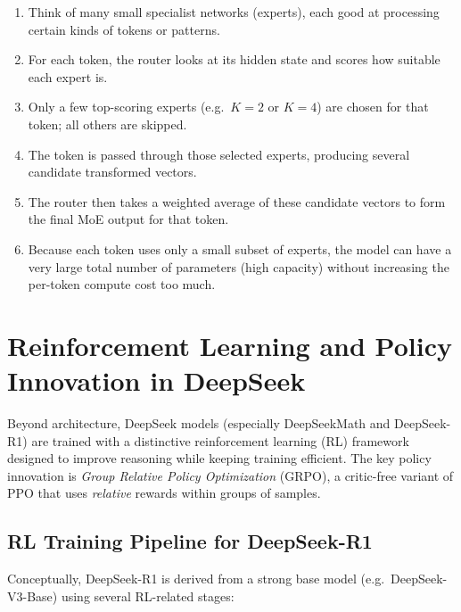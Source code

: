 \documentclass[11pt]{article}
\theoremstyle{remark}
\begin{document}
\begin{enumerate}[label=\arabic*)]
  \item Think of many small specialist networks (experts), each good at processing certain kinds of tokens or patterns.
  \item For each token, the router looks at its hidden state and scores how suitable each expert is.
  \item Only a few top-scoring experts (e.g.\ $K=2$ or $K=4$) are chosen for that token; all others are skipped.
  \item The token is passed through those selected experts, producing several candidate transformed vectors.
  \item The router then takes a weighted average of these candidate vectors to form the final MoE output for that token.
  \item Because each token uses only a small subset of experts, the model can have a very large total number of parameters (high capacity) without increasing the per-token compute cost too much.
\end{enumerate}

\section{Reinforcement Learning and Policy Innovation in DeepSeek}

Beyond architecture, DeepSeek models (especially DeepSeekMath and DeepSeek-R1) are trained with a distinctive reinforcement learning (RL) framework designed to improve reasoning while keeping training efficient. The key policy innovation is \emph{Group Relative Policy Optimization} (GRPO), a critic-free variant of PPO that uses \emph{relative} rewards within groups of samples.

\subsection{RL Training Pipeline for DeepSeek-R1}

Conceptually, DeepSeek-R1 is derived from a strong base model (e.g.\ DeepSeek-V3-Base) using several RL-related stages:
\end{document}
